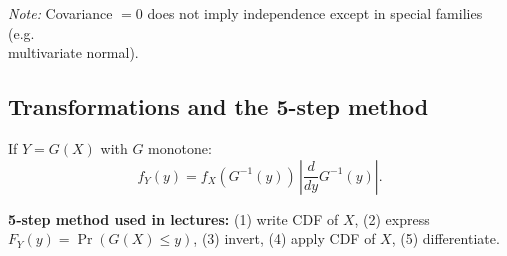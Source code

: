 \documentclass[11pt]{article}
\begin{document}
\textit{Note:} Covariance $=0$ does not imply independence except in special families (e.g.\\ multivariate normal).

\subsection*{Transformations and the 5-step method}
If $Y=G(X)$ with $G$ monotone:
\[
f_Y(y)=f_X(G^{-1}(y))\,\left|\frac{d}{dy} G^{-1}(y)\right|.
\]
\begin{notebox}
\textbf{5‑step method used in lectures:} (1) write CDF of $X$, (2) express $F_Y(y)=\Pr(G(X)\le y)$, (3) invert, (4) apply CDF of $X$, (5) differentiate.
\end{notebox}

\end{document}
